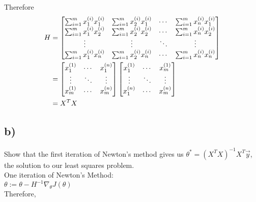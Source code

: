 \documentclass[11pt]{article}
\begin{document}
Therefore
\begin{align*}
  H &= 
  \begin{bmatrix}
    \sum_{i=1}^{m} x_{1}^{(i)} x_{1}^{(i)} & \sum_{i=1}^{m} x_{2}^{(i)} x_{1}^{(i)} & \cdots & \sum_{i=1}^{m} x_{n}^{(i)} x_{1}^{(i)} \\
    \sum_{i=1}^{m} x_{1}^{(i)} x_{2}^{(i)} & \sum_{i=1}^{m} x_{2}^{(i)} x_{2}^{(i)} & \cdots & \sum_{i=1}^{m} x_{n}^{(i)} x_{2}^{(i)} \\
    \vdots                           & \vdots                           & \ddots & \vdots \\
    \sum_{i=1}^{m} x_{1}^{(i)} x_{n}^{(i)} & \sum_{i=1}^{m} x_{2}^{(i)} x_{n}^{(i)} & \cdots & \sum_{i=1}^{m} x_{n}^{(i)} x_{n}^{(i)} 
  \end{bmatrix}
  \\ &=
  \begin{bmatrix}
    x_{1}^{(1)} & \cdots & x_{1}^{(n)} \\
    \vdots      & \ddots & \vdots \\
    x_{m}^{(1)} & \cdots & x_{m}^{(n)}
  \end{bmatrix}
  \begin{bmatrix}
    x_{1}^{(1)} & \cdots & x_{m}^{(1)} \\
    \vdots      & \ddots & \vdots \\
    x_{1}^{(n)} & \cdots & x_{m}^{(n)}
  \end{bmatrix}
  \\ &= X^{T} X
\end{align*}

\subsection*{b)}

Show that the first iteration of Newton's method gives us $\theta^{*} = (X^{T} X)^{-1} X^{T} \vec{y}$, the solution to our least squares problem. \\

One iteration of Newton's Method: \\
$\theta := \theta - H^{-1} \nabla_{\theta} J(\theta)$ \\
Therefore,
\end{document}
